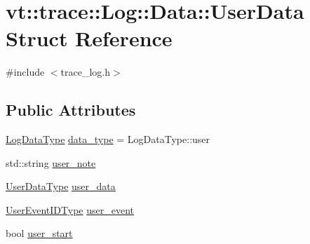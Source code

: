\hypertarget{structvt_1_1trace_1_1_log_1_1_data_1_1_user_data}{}\section{vt\+:\+:trace\+:\+:Log\+:\+:Data\+:\+:User\+Data Struct Reference}
\label{structvt_1_1trace_1_1_log_1_1_data_1_1_user_data}


{\ttfamily \#include $<$trace\+\_\+log.\+h$>$}

\subsection*{Public Attributes}
\begin{DoxyCompactItemize}
\item 
\hyperlink{structvt_1_1trace_1_1_log_ae1c08093fd18967b7d4912d04d6acc3d}{Log\+Data\+Type} \hyperlink{structvt_1_1trace_1_1_log_1_1_data_1_1_user_data_a74f45e93662407f9b432a640807472c9}{data\+\_\+type} = Log\+Data\+Type\+::user
\item 
std\+::string \hyperlink{structvt_1_1trace_1_1_log_1_1_data_1_1_user_data_a14f69beb263080bf4fd0872fafcf4b6c}{user\+\_\+note}
\item 
\hyperlink{structvt_1_1trace_1_1_log_af392c3825bf45d286a0f77bddf7a96cf}{User\+Data\+Type} \hyperlink{structvt_1_1trace_1_1_log_1_1_data_1_1_user_data_ade431a285a79e18cfe816f03d1ae7285}{user\+\_\+data}
\item 
\hyperlink{namespacevt_1_1trace_a5908920d051c144c89f17c69ed262350}{User\+Event\+I\+D\+Type} \hyperlink{structvt_1_1trace_1_1_log_1_1_data_1_1_user_data_a00002c986ccb5d7e267eecfad00941fc}{user\+\_\+event}
\item 
bool \hyperlink{structvt_1_1trace_1_1_log_1_1_data_1_1_user_data_a99efa647964217841ba1862f07b00868}{user\+\_\+start}
\end{DoxyCompactItemize}
